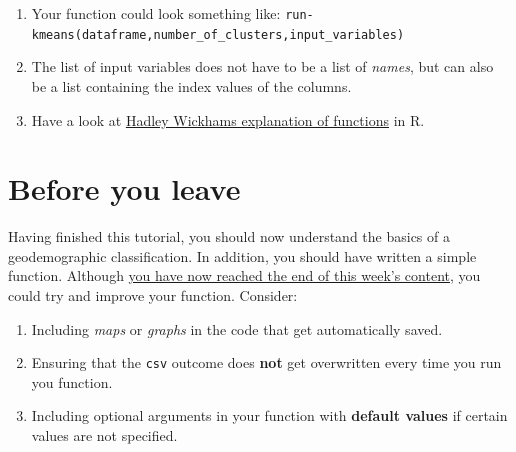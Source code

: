 \documentclass[
  letterpaper,
  DIV=11,
  numbers=noendperiod]{scrreprt}
\providecommand{\tightlist}{%
  \setlength{\itemsep}{0pt}\setlength{\parskip}{0pt}}\usepackage{longtable,booktabs,array}
\begin{document}
\begin{tcolorbox}[enhanced jigsaw, rightrule=.15mm, colback=white, opacityback=0, opacitybacktitle=0.6, coltitle=black, colbacktitle=quarto-callout-note-color!10!white, breakable, arc=.35mm, title=\textcolor{quarto-callout-note-color}{\faInfo}\hspace{0.5em}{Note}, left=2mm, leftrule=.75mm, bottomtitle=1mm, toprule=.15mm, bottomrule=.15mm, colframe=quarto-callout-note-color-frame, toptitle=1mm, titlerule=0mm]

\begin{enumerate}
\def\labelenumi{\arabic{enumi}.}
\tightlist
\item
  Your function could look something like:
  \texttt{run-kmeans(dataframe,number\_of\_clusters,input\_variables)}
\item
  The list of input variables does not have to be a list of
  \emph{names}, but can also be a list containing the index values of
  the columns.
\item
  Have a look at \href{https://r4ds.had.co.nz/functions.html}{Hadley
  Wickhams explanation of functions} in R.
\end{enumerate}

\end{tcolorbox}

\hypertarget{byl-geo}{%
\section{Before you leave}\label{byl-geo}}

Having finished this tutorial, you should now understand the basics of a
geodemographic classification. In addition, you should have written a
simple function. Although
\href{https://www.youtube.com/watch?v=8iwBM_YB1sE}{you have now reached
the end of this week's content}, you could try and improve your
function. Consider:

\begin{enumerate}
\def\labelenumi{\arabic{enumi}.}
\tightlist
\item
  Including \emph{maps} or \emph{graphs} in the code that get
  automatically saved.
\item
  Ensuring that the \texttt{csv} outcome does \textbf{not} get
  overwritten every time you run you function.
\item
  Including optional arguments in your function with \textbf{default
  values} if certain values are not specified.
\end{enumerate}
\end{document}
